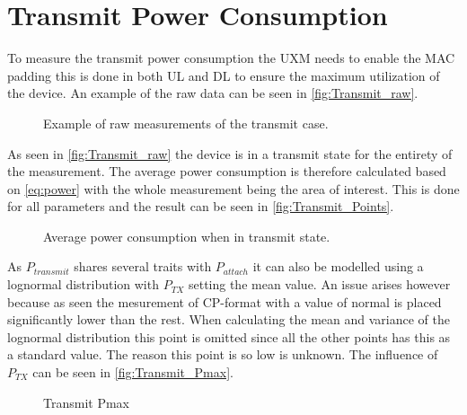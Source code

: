 \section{Transmit Power Consumption}

To measure the transmit power consumption the UXM needs to enable the MAC padding this is done in both UL and DL to ensure the maximum utilization of the device. An example of the raw data can be seen in \autoref{fig:Transmit_raw}.

\begin{figure}[H]
\centering
{}
\resizebox{0.6\textwidth}{!}{
}
\caption{Example of raw measurements of the transmit case.}
\label{fig:Transmit_raw}
\end{figure}

As seen in \autoref{fig:Transmit_raw} the device is in a transmit state for the entirety of the measurement. The average power consumption is therefore calculated based on \autoref{eq:power} with the whole measurement being the area of interest. This is done for all parameters and the result can be seen in \autoref{fig:Transmit_Points}.

\begin{figure}[H]
\centering
\begin{minipage}{0.48\textwidth}
\resizebox{\textwidth}{!}{
}
\end{minipage}
\hfill
\begin{minipage}{0.48\textwidth}
\resizebox{\textwidth}{!}{
}
\end{minipage}
\caption{Average power consumption when in transmit state.}
\label{fig:Transmit_Points}
\end{figure}

As $P_{transmit}$ shares several traits with $P_{attach}$ it can also be modelled using a lognormal distribution with $P_{TX}$ setting the mean value. An issue arises however because as seen the mesurement of CP-format with a value of normal is placed significantly lower than the rest. When calculating the mean and variance of the lognormal distribution this point is omitted since all the other points has this as a standard value. The reason this point is so low is unknown. The influence of $P_{TX}$ can be seen in \autoref{fig:Transmit_Pmax}. 

\begin{figure}[H]
\centering
{}
\resizebox{0.7\textwidth}{!}{
}
\caption{Transmit Pmax}
\label{fig:Transmit_Pmax}
\end{figure}

